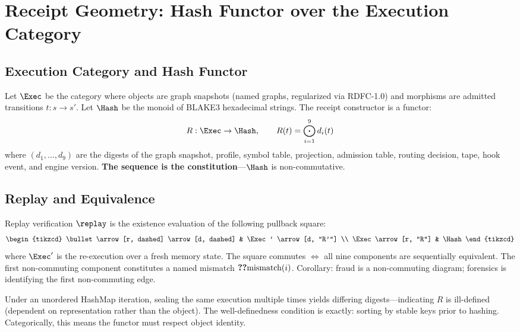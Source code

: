 \chapter{Receipt Geometry: Hash Functor over the Execution Category}

\section{Execution Category and Hash Functor}

\begin{defn}
Let $\Exec$ be the category where objects are graph snapshots (named graphs, regularized via RDFC-1.0) and morphisms are admitted transitions $t : s \to s'$. Let $\Hash$ be the monoid of BLAKE3 hexadecimal strings. The receipt constructor is a functor:
\[
R : \Exec \to \Hash, \qquad
R(t) = \bigodot_{i=1}^{9} d_i(t)
\]
where $(d_1,\dots,d_9)$ are the digests of the graph snapshot, profile, symbol table, projection, admission table, routing decision, tape, hook event, and engine version. \textbf{The sequence is the constitution}---$\Hash$ is non-commutative.
\end{defn}

\section{Replay and Equivalence}

\begin{thm}
Replay verification $\replay$ is the existence evaluation of the following pullback square:
\[
\begin{tikzcd}
\bullet \arrow[r, dashed] \arrow[d, dashed] & \Exec' \arrow[d, "R'"] \\
\Exec \arrow[r, "R"] & \Hash
\end{tikzcd}
\]
where $\Exec'$ is the re-execution over a fresh memory state. The square commutes $\iff$ all nine components are sequentially equivalent. The first non-commuting component constitutes a named mismatch $\Ref_{\text{mismatch}(i)}$. Corollary: fraud is a non-commuting diagram; forensics is identifying the first non-commuting edge.
\end{thm}

\begin{obs}
Under an unordered HashMap iteration, sealing the same execution multiple times yields differing digests---indicating $R$ is ill-defined (dependent on representation rather than the object). The well-definedness condition is exactly: sorting by stable keys prior to hashing. Categorically, this means the functor must respect object identity.
\end{obs}
